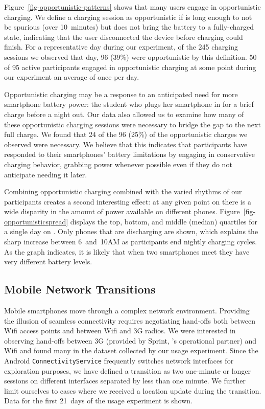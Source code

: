 Figure~\ref{fig-opportunistic-patterns} shows that many users engage in
opportunistic charging. We define a charging session as opportunistic if is
long enough to not be spurious (over 10~minutes) but does not bring the
battery to a fully-charged state, indicating that the user disconnected the
device before charging could finish. For a representative day during our
experiment, of the 245 charging sessions we observed that day, 96 (39\%) were
opportunistic by this definition. 50 of 95 active participants engaged in
opportunistic charging at some point during our experiment an average of once
per day.

Opportunistic charging may be a response to an anticipated need for more
smartphone battery power: the student who plugs her smartphone in for a brief
charge before a night out. Our data also allowed us to examine how many of
these opportunistic charging sessions were necessary to bridge the gap to the
next full charge. We found that 24 of the 96 (25\%) of the opportunistic
charges we observed were necessary. We believe that this indicates that
participants have responded to their smartphones' battery limitations by
engaging in conservative charging behavior, grabbing power whenever possible
even if they do not anticipate needing it later.

Combining opportunistic charging combined with the varied rhythms of our
participants creates a second interesting effect: at any given point on
\PhoneLab{} there is a wide disparity in the amount of power available on
different phones. Figure~\ref{fig-opportunisticspread} displays the top,
bottom, and middle (median) quartiles for a single day on \PhoneLab{}. Only
phones that are discharging are shown, which explains the sharp increase
between 6~and~10AM as participants end nightly charging cycles.  As the graph
indicates, it is likely that when two smartphones meet they have very
different battery levels.

\subsection{Mobile Network Transitions}
\label{subsec-networktransitions}

Mobile smartphones move through a complex network environment. Providing the
illusion of seamless connectivity requires negotiating hand-offs both between
Wifi access points and between Wifi and 3G radios. We were interested in
observing hand-offs between 3G (provided by Sprint, \PhoneLab{}'s operational
partner) and Wifi and found many in the dataset collected by our usage
experiment. Since the Android \texttt{ConnectivityService} frequently
switches network interfaces for exploration purposes, we have defined a
transition as two one-minute or longer sessions on different interfaces
separated by less than one minute. We further limit ourselves to cases where
we received a location update during the transition. Data for the first
21~days of the usage experiment is shown.

